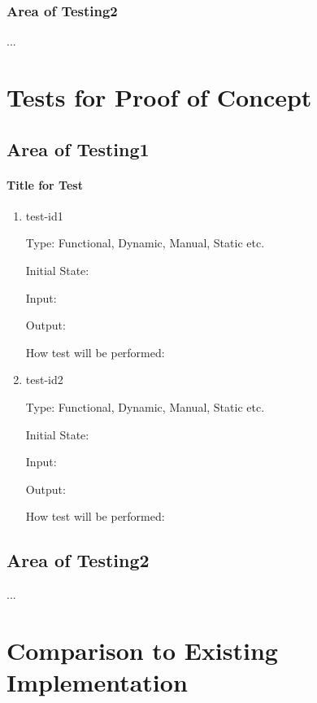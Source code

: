 \documentclass[12pt, titlepage]{article}
\begin{document}
\subsubsection{Area of Testing2}

...

\section{Tests for Proof of Concept}

\subsection{Area of Testing1}
		
\paragraph{Title for Test}

\begin{enumerate}

\item{test-id1\\}

Type: Functional, Dynamic, Manual, Static etc.
					
Initial State: 
					
Input: 
					
Output: 
					
How test will be performed: 
					
\item{test-id2\\}

Type: Functional, Dynamic, Manual, Static etc.
					
Initial State: 
					
Input: 
					
Output: 
					
How test will be performed: 

\end{enumerate}

\subsection{Area of Testing2}

...

	
\section{Comparison to Existing Implementation}	
				
\end{document}

